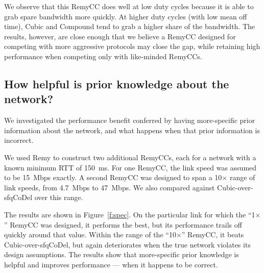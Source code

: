 \vspace{\baselineskip}




We observe that this RemyCC does well at low duty cycles because it is
able to grab spare bandwidth more quickly. At higher duty cycles (with
low mean off time), Cubic and Compound tend to grab a higher share of
the bandwidth. The results, however, are close enough that we believe
a RemyCC designed for competing with more aggressive protocols may
close the gap, while retaining high performance when competing only with
like-minded RemyCCs.

\subsection{How helpful is prior knowledge about the network?}

We investigated the performance benefit conferred by having
more-specific prior information about the network, and what happens
when that prior information is incorrect.

We used Remy to construct two additional RemyCCs, each for a network
with a known minimum RTT of 150~ms. For one RemyCC, the link speed was
assumed to be 15~Mbps exactly. A second RemyCC was designed to span
a 10$\times$ range of link speeds, from 4.7~Mbps to 47~Mbps. We also
compared against Cubic-over-sfqCoDel over this range.

The results are shown in Figure~\ref{f:spec}. On the particular link
for which the ``1$\times$'' RemyCC was designed, it performs the best,
but its performance trails off quickly around that value. Within the
range of the ``10$\times$'' RemyCC, it beats Cubic-over-sfqCoDel, but
again deteriorates when the true network violates its design
assumptions. The results show that more-specific prior knowledge is
helpful and improves performance --- when it happens to be correct.

